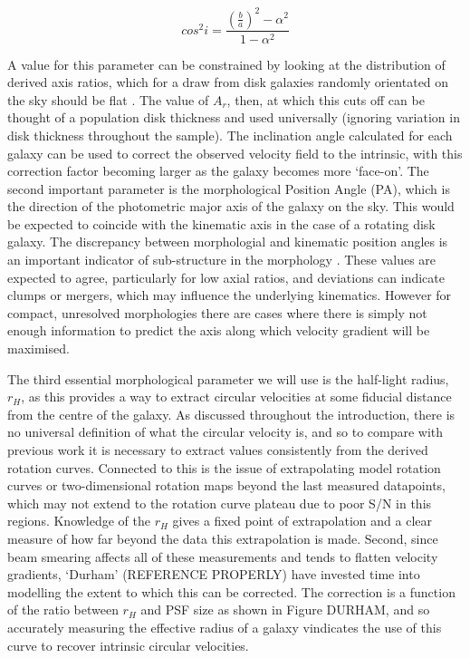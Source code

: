 \documentclass[a4paper,fleqn,usenatbib]{mn2e}
\begin{document}
\begin{equation}\label{eq:holmberg_i}
   cos^{2}i = \frac{\left(\frac{b}{a}\right)^{2} - \alpha^{2}}{1 - \alpha^{2}}
\end{equation}

A value for this parameter can be constrained by looking at the distribution of derived axis ratios, which for a draw from disk galaxies randomly orientated on the sky should be flat \citep{Sandage1970}.
The value of $A_{r}$, then, at which this cuts off can be thought of a population disk thickness and used universally (ignoring variation in disk thickness throughout the sample).
The inclination angle calculated for each galaxy can be used to correct the observed velocity field to the intrinsic, with this correction factor becoming larger as the galaxy becomes more `face-on'.
The second important parameter is the morphological Position Angle (PA), which is the direction of the photometric major axis of the galaxy on the sky.
This would be expected to coincide with the kinematic axis in the case of a rotating disk galaxy.
The discrepancy between morphologial and kinematic position angles is an important indicator of sub-structure in the morphology \citep{Queyrel2012,Wisnioski2015}.
These values are expected to agree, particularly for low axial ratios, and deviations can indicate clumps or mergers, which may influence the underlying kinematics. 
However for compact, unresolved morphologies there are cases where there is simply not enough information to predict the axis along which velocity gradient will be maximised.

The third essential morphological parameter we will use is the half-light radius, $r_{H}$, as this provides a way to extract circular velocities at some fiducial distance from the centre of the galaxy.
As discussed throughout the introduction, there is no universal definition of what the circular velocity is, and so to compare with previous work it is necessary to extract values consistently from the derived rotation curves.
Connected to this is the issue of extrapolating model rotation curves or two-dimensional rotation maps beyond the last measured datapoints, which may not extend to the rotation curve plateau due to poor S/N in this regions.
Knowledge of the $r_{H}$ gives a fixed point of extrapolation and a clear measure of how far beyond the data this extrapolation is made.
Second, since beam smearing affects all of these measurements and tends to flatten velocity gradients, `Durham' (REFERENCE PROPERLY) have invested time into modelling the extent to which this can be corrected.
The correction is a function of the ratio between $r_{H}$ and PSF size as shown in Figure DURHAM, and so accurately measuring the effective radius of a galaxy vindicates the use of this curve to recover intrinsic circular velocities. 
\end{document}
